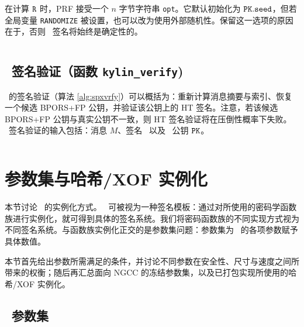 在计算 $\tt{R}$ 时，PRF 接受一个 $n$ 字节字符串 \texttt{opt}。它默认初始化为 $\pk.\seed$，但若全局变量 \texttt{RANDOMIZE} 被设置，也可以改为使用外部随机性。保留这一选项的原因在于，否则 \SPHINCSA\ 签名将始终是确定性的。

\begin{algorithm}[ht]
    \inputminted[breaklines,linenos,tabsize=2,mathescape,escapeinside=||]{C}{paper/code/kylin_sign.cs}
    \caption{\texttt{kylin\_sign} --- 生成 \SPHINCSA\ 签名。}
    \label{alg:spxsign}
\end{algorithm}

\subsection{\SPHINCSA\ 签名验证（函数 \texttt{kylin\_verify})}

\SPHINCSA\ 的签名验证（算法 \ref{alg:spxvrfy}）可以概括为：重新计算消息摘要与索引、恢复一个候选 BPORS+FP 公钥，并验证该公钥上的 HT 签名。注意，若该候选 BPORS+FP 公钥与真实公钥不一致，则 HT 签名验证将在压倒性概率下失败。 \SPHINCSA\ 签名验证的输入包括：消息 $M$、签名 \sig\ 以及 \SPHINCSA\ 公钥 $\pk$。

\begin{algorithm}[ht]
    \inputminted[breaklines,linenos,tabsize=2,mathescape,escapeinside=||]{C}{paper/code/kylin_verify.cs}
    \caption{\texttt{kylin\_verify} --- 使用 \SPHINCSA\ 公钥 $\bf PK$ 验证消息 $M$ 上的 \SPHINCSA\ 签名 $\bf SIG$。}
    \label{alg:spxvrfy}
\end{algorithm}

\section{参数集与哈希/XOF 实例化}
\label{sec:instantiations}

本节讨论 \SPHINCSA\ 的实例化方式。 \SPHINCSA\ 可被视为一种签名模板：通过对所使用的密码学函数族进行实例化，就可得到具体的签名系统。我们将密码函数族的不同实现方式视为不同签名系统。与函数族实例化正交的是参数集问题：参数集为 \SPHINCSA\ 的各项参数赋予具体数值。

本节首先给出参数所需满足的条件，并讨论不同参数在安全性、尺寸与速度之间所带来的权衡；随后再汇总面向 NGCC 的冻结参数集，以及已打包实现所使用的哈希/XOF 实例化。

\subsection{\SPHINCSA\ 参数集}


